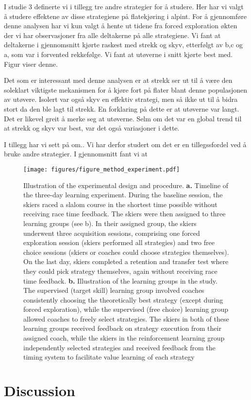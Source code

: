 \documentclass[letterpaper,10pt]{article}
\begin{document}
I studie 3 definerte vi i tillegg tre andre strategier for å studere. Her har vi valgt å studere effektene av disse strategiene på flatekjøring i alpint. For å gjennomføre denne analysen har vi kun valgt å hente ut tidene fra forced exploration økten der vi har observasjoner fra alle deltakerne på alle strategiene. Vi fant at deltakerne i gjennomsnitt kjørte raskest med strekk og skyv, etterfølgt av b,c og a, som var i forvented rekkefølge. Vi fant at utøverne i snitt kjørte best med. Figur viser denne. 

Det som er interessant med denne analysen er at strekk ser ut til å være den soleklart viktigste mekanismen for å kjøre fort på flater blant denne populasjonen av utøvere. Isolert var også skyv en effektiv strategi, men så ikke ut til å bidra stort da den ble lagt til strekk. En forklaring på dette er at utøverne var langt. Det er likevel greit å merke seg at utøverne. Selm om det var en global trend til at strekk og skyv var best, var det også variasjoner i dette. 

I tillegg har vi sett på om.. Vi har derfor studert om det er en tillegssfordel ved å bruke andre strategier. I gjennomsnitt fant vi at 


\begin{figure}[H]
\centering
\texttt{[image: figures/figure\_method\_experiment.pdf]}
\caption{Illustration of the experimental design and procedure. \textbf{a.} Timeline of the three-day learning experiment. During the baseline session, the skiers raced a slalom course in the shortest time possible without receiving race time feedback. The skiers were then assigned to three learning groups (see b). In their assigned group, the skiers underwent three acquisition sessions, comprising one forced exploration session (skiers performed all strategies) and two free choice sessions (skiers or coaches could choose strategies themselves). On the last day, skiers completed a retention and transfer test where they could pick strategy themselves, again without receiving race time feedback. \textbf{b.} Illustration of the learning groups in the study. The supervised (target skill) learning group involved coaches consistently choosing the theoretically best strategy (except during forced exploration), while the supervised (free choice) learning group allowed coaches to freely select strategies. The skiers in both of these learning groups received feedback on strategy execution from their assigned coach, while the skiers in the reinforcement learning group independently selected strategies and received feedback from the timing system to facilitate value learning of each strategy}
\label{fig:experiment}
\end{figure}



\section{Discussion}

\section{}

\printbibliography
\end{document}

